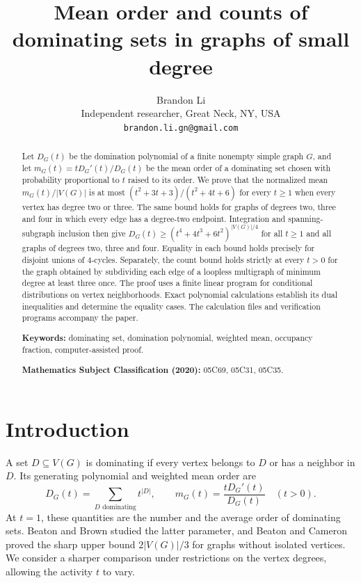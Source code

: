 \documentclass[11pt]{article}
\title{Mean order and counts of dominating sets in graphs of small degree}
\author{Brandon Li\\\small Independent researcher, Great Neck, NY, USA\\\small\texttt{brandon.li.gn@gmail.com}}
\date{}
\begin{document}
\raggedbottom
\maketitle
\begin{abstract}
Let $D_G(t)$ be the domination polynomial of a finite nonempty simple graph $G$, and let $m_G(t)=tD_G'(t)/D_G(t)$ be the mean order of a dominating set chosen with probability proportional to $t$ raised to its order. We prove that the normalized mean $m_G(t)/|V(G)|$ is at most $(t^2+3t+3)/(t^2+4t+6)$ for every $t\ge1$ when every vertex has degree two or three. The same bound holds for graphs of degrees two, three and four in which every edge has a degree-two endpoint. Integration and spanning-subgraph inclusion then give $D_G(t)\ge(t^4+4t^3+6t^2)^{|V(G)|/4}$ for all $t\ge1$ and all graphs of degrees two, three and four. Equality in each bound holds precisely for disjoint unions of $4$-cycles. Separately, the count bound holds strictly at every $t>0$ for the graph obtained by subdividing each edge of a loopless multigraph of minimum degree at least three once. The proof uses a finite linear program for conditional distributions on vertex neighborhoods. Exact polynomial calculations establish its dual inequalities and determine the equality cases. The calculation files and verification programs accompany the paper.

\medskip\noindent\textbf{Keywords:} dominating set, domination polynomial, weighted mean, occupancy fraction, computer-assisted proof.

\smallskip\noindent\textbf{Mathematics Subject Classification (2020):} 05C69, 05C31, 05C35.
\end{abstract}

\section{Introduction}\label{sec:intro}
A set $D\subseteq V(G)$ is dominating if every vertex belongs to $D$ or has a neighbor in $D$. Its generating polynomial and weighted mean order are
\[
 D_G(t)=\sum_{D\text{ dominating}}t^{|D|},\qquad
 m_G(t)=\frac{tD_G'(t)}{D_G(t)}\quad(t>0).
\]
At $t=1$, these quantities are the number and the average order of dominating sets. Beaton and Brown \cite{BB2021} studied the latter parameter, and Beaton and Cameron \cite[Theorem 2.10]{BC2024} proved the sharp upper bound $2|V(G)|/3$ for graphs without isolated vertices. We consider a sharper comparison under restrictions on the vertex degrees, allowing the activity $t$ to vary.
\end{document}
